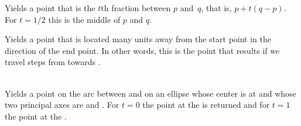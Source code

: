 \begin{command}{\pgfpointlineattime{}}
  Yields a point that is the $t$th fraction between $p$
  and~$q$, that is, $p + t(q-p)$. For $t=1/2$ this is the middle of
  $p$ and $q$.

\begin{codeexample}[]
\end{codeexample}
\end{command}

\begin{command}{\pgfpointlineatdistance{}}
  Yields a point that is located  many units away
  from the start point in the direction of the end point. In other
  words, this is the point that results if we travel 
  steps from  towards .
  \example
\begin{codeexample}[]
\end{codeexample}
\end{command}

\begin{command}{\pgfpointarcaxesattime{}\\}
  Yields a point on the arc between  and  on an ellipse whose center is at  and whose
  two principal axes are  and . For $t=0$ the point at the  is returned
  and for $t=1$ the point at the .

\begin{codeexample}[]
\end{codeexample}
\end{command}

